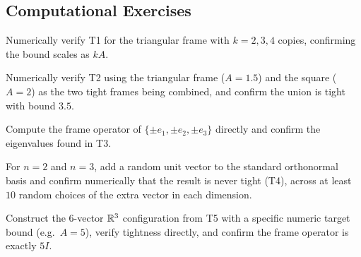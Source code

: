 \subsection*{Computational Exercises}
\begin{compexercises}
	\item Numerically verify T1 for the triangular frame with $k=2,3,4$
	copies, confirming the bound scales as $kA$.
	
	\item Numerically verify T2 using the triangular frame ($A=1.5$) and
	the square ($A=2$) as the two tight frames being combined, and
	confirm the union is tight with bound $3.5$.
	
	\item Compute the frame operator of $\{\pm e_1,\pm e_2,\pm e_3\}$
	directly and confirm the eigenvalues found in T3.
	
	\item For $n=2$ and $n=3$, add a random unit vector to the standard
	orthonormal basis and confirm numerically that the result is
	never tight (T4), across at least $10$ random choices of the
	extra vector in each dimension.
	
	\item Construct the $6$-vector $\mathbb{R}^3$ configuration from T5 with a
	specific numeric target bound (e.g.\ $A=5$), verify tightness
	directly, and confirm the frame operator is exactly $5I$.
\end{compexercises}
